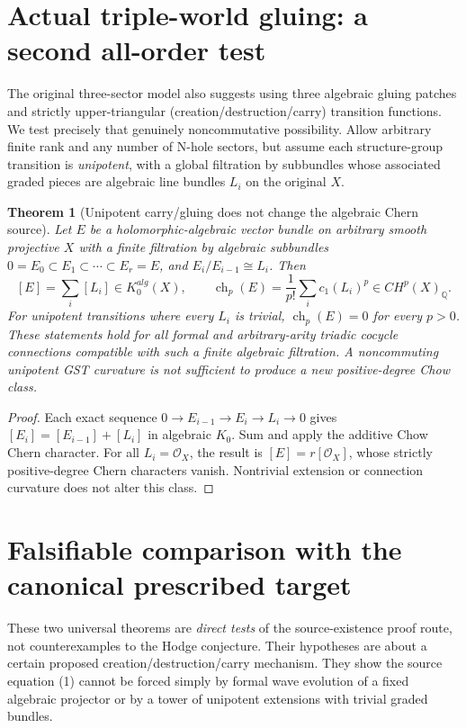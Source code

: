 \documentclass[11pt]{article}
\newtheorem{theorem}{Theorem}[section]
\begin{document}
\section{Actual triple-world gluing: a second all-order test}
The original three-sector model also suggests using three algebraic gluing patches and strictly upper-triangular (creation/destruction/carry) transition functions. We test precisely that genuinely noncommutative possibility. Allow arbitrary finite rank and any number of N-hole sectors, but assume each structure-group transition is \emph{unipotent}, with a global filtration by subbundles whose associated graded pieces are algebraic line bundles \(L_i\) on the original \(X\).

\begin{theorem}[Unipotent carry/gluing does not change the algebraic Chern source]
Let \(E\) be a holomorphic-algebraic vector bundle on arbitrary smooth projective \(X\) with a finite filtration by algebraic subbundles \(0=E_0\subset E_1\subset\cdots\subset E_r=E\), and \(E_i/E_{i-1}\cong L_i\). Then
\[
\boxed{[E]=\sum_i[L_i]\in K_0^{alg}(X),\qquad
\operatorname{ch}_p(E)=\frac1{p!}\sum_i c_1(L_i)^p\in CH^p(X)_{\mathbb Q}.}
\tag{4}
\]
For unipotent transitions where every \(L_i\) is trivial,
\(\operatorname{ch}_p(E)=0\) for every \(p>0\).
These statements hold for all formal and arbitrary-arity triadic cocycle connections compatible with such a finite algebraic filtration. A noncommuting unipotent GST curvature is not sufficient to produce a new positive-degree Chow class.
\end{theorem}
\begin{proof}
Each exact sequence \(0\to E_{i-1}\to E_i\to L_i\to0\) gives \([E_i]=[E_{i-1}]+[L_i]\) in algebraic \(K_0\). Sum and apply the additive Chow Chern character. For all \(L_i=\mathcal O_X\), the result is \([E]=r[\mathcal O_X]\), whose strictly positive-degree Chern characters vanish. Nontrivial extension or connection curvature does not alter this class.
\end{proof}

\section{Falsifiable comparison with the canonical prescribed target}
These two universal theorems are \emph{direct tests} of the source-existence proof route, not counterexamples to the Hodge conjecture. Their hypotheses are about a certain proposed creation/destruction/carry mechanism. They show the source equation (1) cannot be forced simply by formal wave evolution of a fixed algebraic projector or by a tower of unipotent extensions with trivial graded bundles.
\end{document}
